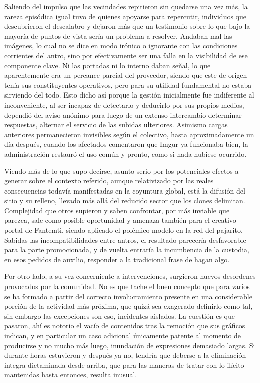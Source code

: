 \documentclass[
]{book}
\begin{document}
Saliendo del impulso que las vecindades repitieron sin quedarse una vez más, la rareza episódica igual tuvo de quienes apoyarse para repercutir, individuos que descubrieron el descalabro y dejaron más que un testimonio sobre lo que bajo la mayoría de puntos de vista sería un problema a resolver. Andaban mal las imágenes, lo cual no se dice en modo irónico o ignorante con las condiciones corrientes del antro, sino por efectivamente ser una falla en la visibilidad de ese componente clave. Ni las portadas ni lo interno daban señal, lo que aparentemente era un percance parcial del proveedor, siendo que este de origen tenía sus constituyentes operativos, pero para su utilidad fundamental no estaba sirviendo del todo. Esto dicho así porque la gestión inicialmente fue indiferente al inconveniente, al ser incapaz de detectarlo y deducirlo por sus propios medios, dependió del aviso anónimo para luego de un extenso intercambio determinar respuestas, alternar el servicio de las subidas ulteriores. Asimismo cargas anteriores permanecieron invisibles según el colectivo, hasta aproximadamente un día después, cuando los afectados comentaron que Imgur ya funcionaba bien, la administración restauró el uso común y pronto, como si nada hubiese ocurrido.

Viendo más de lo que supo decirse, asunto serio por los potenciales efectos a generar sobre el contexto referido, aunque relativizado por las reales consecuencias todavía manifestadas en la coyuntura global, está la difusión del sitio y su relleno, llevado más allá del reducido sector que los clones delimitan. Complejidad que otros supieron y saben confrontar, por más inviable que parezca, sale como posible oportunidad y amenaza también para el creativo portal de Fantemti, siendo aplicado el polémico modelo en la red del pajarito. Sabidas las incompatibilidades entre antros, el resultado parecería desfavorable para la parte promocionada, y de vuelta entraría la incumbencia de la custodia, en esos pedidos de auxilio, responder a la tradicional frase de hagan algo.

Por otro lado, a su vez concerniente a intervenciones, surgieron nuevos desordenes provocados por la comunidad. No es que tache el buen concepto que para varios se ha formado a partir del correcto involucramiento presente en una considerable porción de la actividad más próxima, que quizá sea exagerado definirlo como tal, sin embargo las excepciones son eso, incidentes aislados. La cuestión es que pasaron, ahí es notorio el vacío de contenidos tras la remoción que sus gráficos indican, y en particular un caso adicional únicamente patente al momento de producirse y no mucho más luego, inundación de expresiones demasiado largas. Si durante horas estuvieron y después ya no, tendría que deberse a la eliminación integra dictaminada desde arriba, que para las maneras de tratar con lo ilícito mantenidas hasta entonces, resulta inusual.
\end{document}

